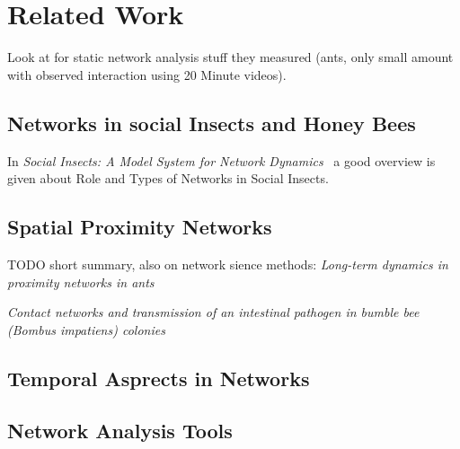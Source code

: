 \chapter{Related Work}

Look at \cite{quevillon2015social} for static network analysis stuff they measured (ants, only small amount with observed interaction using 20 Minute videos).

\section{Networks in social Insects and Honey Bees}

In \emph{Social Insects: A Model System for Network Dynamics}~\cite{charbonneau2013social} a good overview is given about Role and Types of Networks in Social Insects.

\section{Spatial Proximity Networks}

TODO short summary, also on network sience methods: \emph{Long-term dynamics in proximity networks in ants}~\cite{jeanson2012long}

\emph{Contact networks and transmission of an intestinal pathogen in bumble bee (Bombus impatiens) colonies}~\cite{otterstatter2007contact}

\section{Temporal Asprects in Networks}

\section{Network Analysis Tools}